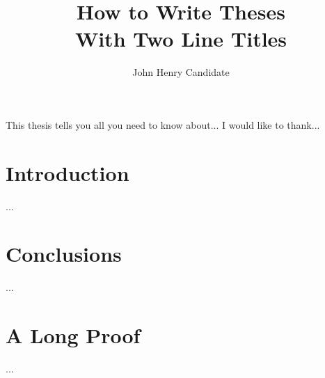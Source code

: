 \documentclass{report}
\begin{document}
\title{How to Write Theses\\
            With Two Line Titles}
\author{John Henry Candidate}
 
\beforepreface
{}
This thesis tells you all you need to know about...
I would like to thank...
\afterpreface

\chapter{Introduction}
...
\chapter{Conclusions}
...
\appendix
\chapter{A Long Proof}
...


\end{document}
